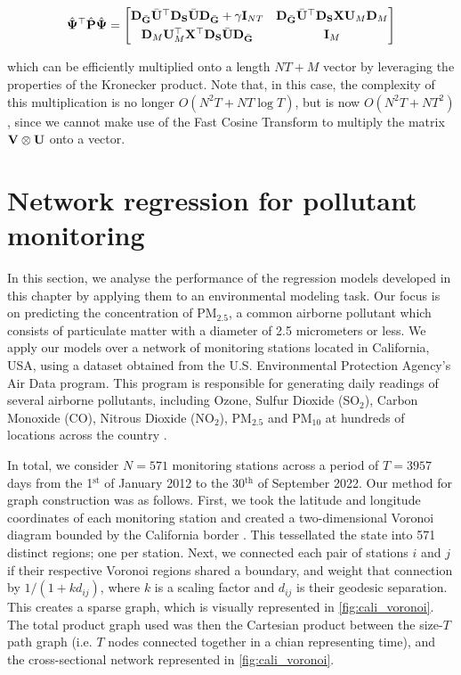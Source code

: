 \begin{equation*}
    \hat{\mathbf{\Psi}}^\top \hat{\mathbf{P}}  \hat{\mathbf{\Psi}} = 
       \begin{bmatrix}
        \mathbf{D}_{\bar{\mathbf{G}}} \bar{\mathbf{U}}^\top \mathbf{D}_{\mathbf{S}} \bar{\mathbf{U}} \mathbf{D}_{\bar{\mathbf{G}}} + \gamma \mathbf{I}_{NT}  &  \mathbf{D}_{\bar{\mathbf{G}}} \bar{\mathbf{U}}^\top \mathbf{D}_{\mathbf{S}} \mathbf{X} \mathbf{U}_M \mathbf{D}_M \\[0.1cm] 
        \mathbf{D}_M \mathbf{U}_M^\top \mathbf{X}^\top \mathbf{D}_{\mathbf{S}} \bar{\mathbf{U}} \mathbf{D}_{\bar{\mathbf{G}}} & \mathbf{I}_M
        \end{bmatrix}
\end{equation*}

which can be efficiently multiplied onto a length $NT + M$ vector by leveraging the properties of the Kronecker product. Note that, in this case, the complexity of this multiplication is no longer $O(N^2T + NT \log T)$, but is now $O(N^2T + NT^2)$, since we cannot make use of the Fast Cosine Transform to multiply the matrix $\mathbf{V} \otimes \mathbf{U}$ onto a vector. 


\section{Network regression for pollutant monitoring}

In this section, we analyse the performance of the regression models developed in this chapter by applying them to an environmental modeling task. Our focus is on predicting the concentration of PM$_{2.5}$, a common airborne pollutant which consists of particulate matter with a diameter of 2.5 micrometers or less. We apply our models over a network of monitoring stations located in California, USA, using a dataset obtained from the U.S. Environmental Protection Agency's Air Data program. This program is responsible for generating daily readings of several airborne pollutants, including Ozone, Sulfur Dioxide (SO$_2$), Carbon Monoxide (CO), Nitrous Dioxide (NO$_2$), PM$_{2.5}$ and PM$_{10}$ at hundreds of locations across the country \citep{EPA2023}.  

In total, we consider $N=571$ monitoring stations across a period of $T=3957$ days from the 1$^\text{st}$ of January 2012 to the 30$^\text{th}$ of September 2022. Our method for graph construction was as follows. First, we took the latitude and longitude coordinates of each monitoring station and created a two-dimensional Voronoi diagram bounded by the California border \citep{Fortune1986}. This tessellated the state into 571 distinct regions; one per station. Next, we connected each pair of stations $i$ and $j$ if their respective Voronoi regions shared a boundary, and weight that connection by  $1 / (1 + kd_{ij})$, where $k$ is a scaling factor and $d_{ij}$ is their geodesic separation. This creates a sparse graph, which is visually represented in \cref{fig:cali_voronoi}. The total product graph used was then the Cartesian product between the size-$T$ path graph (i.e. $T$ nodes connected together in a chian representing time), and the cross-sectional network represented in \cref{fig:cali_voronoi}. 

